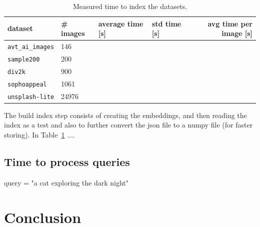 \documentclass{article}
\begin{document}
\begin{table}[htb!]
\caption{Measured time to index the datasets.}
\label{tbl:measured_time_to_index_the_datasets_}
\begin{tabular}{llllr}
\toprule
dataset                  & \# images & average time [s]   & std time [s]       & avg time per image [s] \\
\midrule
\texttt{avt\_ai\_images} & 146       &                    &                    & \\
\texttt{sample200}       & 200       &                    &                    & \\
\texttt{div2k}           & 900       &                    &                    & \\
\texttt{sophoappeal}     & 1061      &                    &                    & \\
\texttt{unsplash-lite}   & 24976     &                    &                    & \\
\bottomrule
\end{tabular}
\end{table}

The build index step consists of creating the embeddings, and then reading the index as a test and also to further convert the json file to a numpy file (for faster storing).
In Table~\ref{tbl:measured_time_to_index_the_datasets_} ....

\subsection{Time to process queries}

query = "a cat exploring the dark night"

\section{Conclusion}




\end{document}
